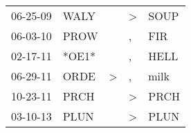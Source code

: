 \begin{supertabular}{p{0.07\textwidth}p{0.06\textwidth}p{0.02\textwidth}p{0.02\textwidth}p{0.06\textwidth}}
 06-25-09\textsuperscript{} &  WALY\textsuperscript{} &               &  \textgreater &  SOUP\textsuperscript{} \\
 06-03-10\textsuperscript{} &  PROW\textsuperscript{} &               &             , &   FIR\textsuperscript{} \\
 02-17-11\textsuperscript{} &                   *OE1* &               &             , &  HELL\textsuperscript{} \\
 06-29-11\textsuperscript{} &  ORDE\textsuperscript{} &  \textgreater &             , &  milk\textsuperscript{} \\
 10-23-11\textsuperscript{} &  PRCH\textsuperscript{} &               &  \textgreater &  PRCH\textsuperscript{} \\
 03-10-13\textsuperscript{} &  PLUN\textsuperscript{} &               &  \textgreater &  PLUN\textsuperscript{} \\
\end{supertabular}
